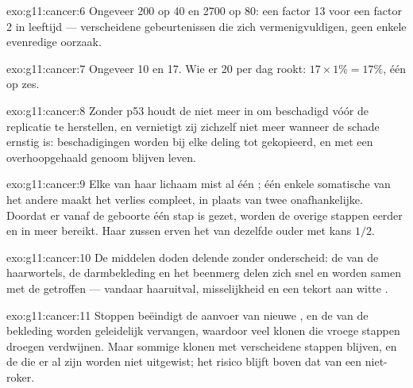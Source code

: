 \begin{solution}{exo:g11:cancer:6}
Ongeveer 200 op 40 en 2700 op 80: een factor 13 voor een factor 2 in
leeftijd --- verscheidene gebeurtenissen die zich vermenigvuldigen, geen
enkele evenredige oorzaak.
\end{solution}

\begin{solution}{exo:g11:cancer:7}
Ongeveer 10 en 17. Wie er 20 per dag rookt: $17 \times 1\% = 17\%$, één op
zes.
\end{solution}

\begin{solution}{exo:g11:cancer:8}
Zonder p53 houdt de  niet meer in om beschadigd  vóór de replicatie
te herstellen, en vernietigt zij zichzelf niet meer wanneer de schade
ernstig is: beschadigingen worden bij elke deling tot  gekopieerd,
en  met een overhoopgehaald genoom blijven leven.
\end{solution}

\begin{solution}{exo:g11:cancer:9}
Elke  van haar lichaam mist al één ; één enkele somatische 
van het andere maakt het verlies compleet, in plaats van twee
onafhankelijke. Doordat er vanaf de geboorte één stap is gezet, worden de
overige stappen eerder en in meer  bereikt. Haar zussen erven het
 van dezelfde ouder met kans $1/2$.
\end{solution}

\begin{solution}{exo:g11:cancer:10}
De middelen doden delende  zonder onderscheid: de  van de
haarwortels, de darmbekleding en het beenmerg delen zich snel en worden
samen met de  getroffen --- vandaar haaruitval, misselijkheid en een
tekort aan witte .
\end{solution}

\begin{solution}{exo:g11:cancer:11}
Stoppen beëindigt de aanvoer van nieuwe , en de  van de
bekleding worden geleidelijk vervangen, waardoor veel klonen die vroege
stappen droegen verdwijnen. Maar sommige klonen met verscheidene stappen
blijven, en de  die er al zijn worden niet uitgewist; het risico
blijft boven dat van een niet-roker.
\end{solution}

